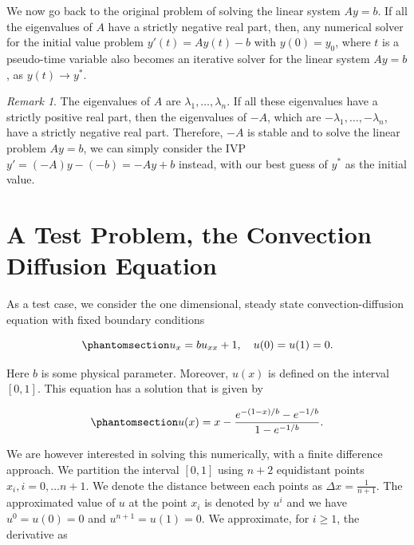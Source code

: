 \documentclass[
  letterpaper,
]{report}
\theoremstyle{definition}
\theoremstyle{plain}
\theoremstyle{definition}
\theoremstyle{remark}
\newtheorem*{remark}{Remark}
\begin{document}
We now go back to the original problem of solving the linear system
\(Ay = b\). If all the eigenvalues of \(A\) have a strictly negative
real part, then, any numerical solver for the initial value problem
\(y'(t) = Ay(t) - b\) with \(y(0) = y_0\), where \(t\) is a pseudo-time
variable also becomes an iterative solver for the linear system
\(Ay = b\), as \(y(t) \to y^*\).

\begin{remark}
The eigenvalues of \(A\) are \(\lambda_1, \dots , \lambda_n\). If all
these eigenvalues have a strictly positive real part, then the
eigenvalues of \(-A\), which are \(-\lambda_1, \dots , -\lambda_n\),
have a strictly negative real part. Therefore, \(-A\) is stable and to
solve the linear problem \(Ay = b\), we can simply consider the IVP
\(y' = (-A)y - (-b) = -Ay+b\) instead, with our best guess of \(y^*\) as
the initial value.
\end{remark}


\chapter{A Test Problem, the Convection Diffusion
Equation}\label{a-test-problem-the-convection-diffusion-equation}

As a test case, we consider the one dimensional, steady state
convection-diffusion equation with fixed boundary conditions

\begin{equation}\phantomsection\label{eq-convec_diff_steady}{
    u_x = bu_{xx} + 1 ,  \quad u(0) = u(1) = 0.
}\end{equation}

Here \(b\) is some physical parameter. Moreover, \(u(x)\) is defined on
the interval \([0,1]\). This equation has a solution that is given by

\begin{equation}\phantomsection\label{eq-convec_diff_th_solution}{
u(x) = x - \frac{e^{-(1-x)/b} - e^{-1/b}}{1-e^{-1/b}}.
}\end{equation}

We are however interested in solving this numerically, with a finite
difference approach. We partition the interval \([0,1]\) using \(n+2\)
equidistant points \(x_i, i = 0, \dots n+1\). We denote the distance
between each points as \(\Delta x = \frac{1}{n+1}\). The approximated
value of \(u\) at the point \(x_i\) is denoted by \(u^i\) and we have
\(u^0 = u(0) = 0\) and \(u^{n+1} = u(1) = 0\). We approximate, for
\(i \geq 1\), the derivative as
\end{document}
